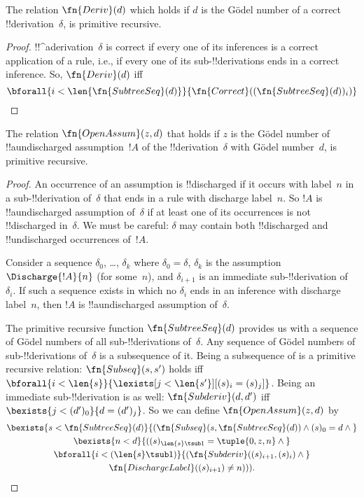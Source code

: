 \documentclass[../../../include/open-logic-section]{subfiles}
\begin{document}
\begin{prop}
  The relation $\fn{Deriv}(d)$ which holds if $d$ is the G\"odel
  number of a correct !!{derivation}~$\delta$, is primitive recursive.
\end{prop}

\begin{proof}
  !!^a{derivation}~$\delta$ is correct if every one of its inferences
  is a correct application of a rule, i.e., if every one of its
  sub-!!{derivation}s ends in a correct inference. So, $\fn{Deriv}(d)$
  iff
  \[
  \bforall{i<\len{\fn{SubtreeSeq}(d)}}{\fn{Correct}((\fn{SubtreeSeq}(d))_i)}
  \]
\end{proof}

\begin{prop}
   The relation $\fn{OpenAssum}(z, d)$ that
  holds if $z$ is the G\"odel number of !!a{undischarged} assumption~$!A$
  of the !!{derivation}~$\delta$ with G\"odel number~$d$, is primitive
  recursive.
\end{prop}

\begin{proof}
  An occurrence of an assumption is !!{discharged} if it occurs with
  label~$n$ in a sub-!!{derivation} of~$\delta$ that ends in a rule
  with discharge label~$n$. So $!A$ is !!a{undischarged} assumption
  of~$\delta$ if at least one of its occurrences is not !!{discharged}
  in~$\delta$. We must be careful: $\delta$ may contain both
  !!{discharged} and !!{undischarged} occurrences of~$!A$.

  Consider a sequence $\delta_0$, \dots, $\delta_k$ where $\delta_0 =
  \delta$, $\delta_k$ is the assumption $\Discharge{!A}{n}$
  (for some~$n$), and $\delta_{i+1}$ is an immediate sub-!!{derivation}
  of~$\delta_i$. If such a sequence exists in which no $\delta_i$
  ends in an inference with discharge label~$n$, then $!A$ is
  !!a{undischarged} assumption of~$\delta$.

  The primitive recursive function $\fn{SubtreeSeq}(d)$ provides us
  with a sequence of G\"odel numbers of all sub-!!{derivation}s
  of~$\delta$. Any sequence of G\"odel numbers of sub-!!{derivation}s
  of~$\delta$ is a subsequence of it. Being a subsequence of is a
  primitive recursive relation: $\fn{Subseq}(s, s')$ holds iff
  $\bforall{i<\len{s}}{\lexists[j<\len{s'}][(s)_i = (s)_j]}$. Being an
  immediate sub-!!{derivation} is as well: $\fn{Subderiv}(d, d')$ iff
  $\bexists{j<(d')_0}{d = (d')_j}$. So we can define
  $\fn{OpenAssum}(z, d)$ by
  \begin{multline*}
    \bexists{s<\fn{SubtreeSeq}(d)}{(\fn{Subseq}(s, \fn{SubtreeSeq}(d))
      \land (s)_0 = d \land {}} \\
    \bexists{n<d}{((s)_{\len{s} \tsub 1} = \tuple{0, z, n} \land {}}\\
      \bforall{i<(\len{s} \tsub 1)}{(\fn{Subderiv}((s)_{i+1}, (s)_i) \land {}}\\
      \fn{DischargeLabel}((s)_{i+1}) \neq n))).
  \end{multline*}
\end{proof}
\end{document}
